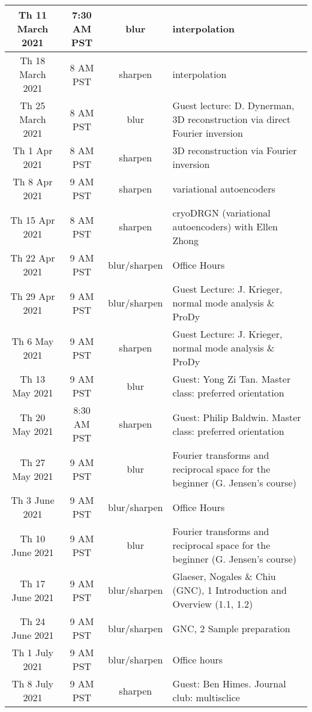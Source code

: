 \documentclass[11pt, oneside]{article}   	%
\begin{document}
\begin{center}
\begin{longtable}{|| c c c p{90mm} ||}
 \hline
Th 11 March 2021 & \tiny{7:30 AM PST} & blur & interpolation  \\ 
 \hline
 Th 18 March 2021 & \tiny{8 AM PST} & sharpen & interpolation  \\ 
 \hline
Th 25 March 2021 & \tiny{8 AM PST} & blur & \tiny{Guest lecture: D. Dynerman, 3D reconstruction via direct Fourier inversion}  \\ 
 \hline
Th 1 Apr 2021 & \tiny{8 AM PST} & sharpen & 3D reconstruction via  Fourier inversion  \\ 
 \hline
Th 8 Apr 2021 & \tiny{9 AM PST} & sharpen & variational autoencoders  \\ 
 \hline
Th 15 Apr 2021 & \tiny{8 AM PST} & sharpen & cryoDRGN (variational autoencoders) with Ellen Zhong  \\ 
 \hline
Th 22 Apr 2021 & \tiny{9 AM PST} & blur/sharpen & Office Hours  \\ 
 \hline
Th 29 Apr 2021 & \tiny{9 AM PST} & blur/sharpen & \tiny{Guest Lecture: J. Krieger, normal mode analysis \& ProDy}  \\ 
 \hline
Th 6 May 2021 & \tiny{9 AM PST} & sharpen & \tiny{Guest Lecture: J. Krieger, normal mode analysis \& ProDy} \\ 
 \hline
Th 13 May 2021 & \tiny{9 AM PST} & blur & \tiny{Guest: Yong Zi Tan. Master class: preferred orientation}  \\ 
 \hline
Th 20 May 2021 & \tiny{8:30 AM PST} & sharpen & \tiny{Guest: Philip Baldwin. Master class: preferred orientation}  \\ 
 \hline
Th 27 May 2021 & \tiny{9 AM PST} & blur & \tiny{Fourier transforms and reciprocal space for the beginner (G. Jensen's course)}  \\ 
 \hline
Th 3 June 2021 & \tiny{9 AM PST} & blur/sharpen & Office Hours  \\ 
 \hline
Th 10 June 2021 & \tiny{9 AM PST} & blur & \tiny{Fourier transforms and reciprocal space for the beginner (G. Jensen's course)}  \\
 \hline
Th 17 June 2021& \tiny{9 AM PST} & blur/sharpen & \tiny{Glaeser, Nogales \& Chiu (GNC), 1 Introduction and Overview (1.1, 1.2)}  \\ 
 \hline
Th 24 June 2021& \tiny{9 AM PST} & blur/sharpen & GNC, 2 Sample preparation  \\
 \hline
Th 1 July 2021& \tiny{9 AM PST} & blur/sharpen & Office hours \\ 
 \hline
Th 8 July 2021 & \tiny{9 AM PST} & sharpen & Guest: Ben Himes. Journal club: multisclice  \\ 

\end{longtable}
\end{center}
\end{document}
